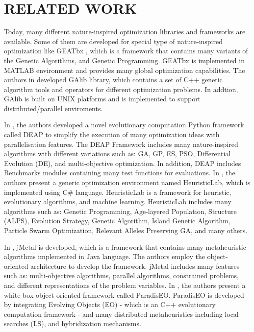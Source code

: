 \documentclass[a4paper,twoside]{article}
\begin{document}
\section{\uppercase{Related Work}}
Today, many different nature-inspired optimization libraries and frameworks are available. Some of them are developed for special type of nature-inspired optimization like GEATbx \cite{GEATbx}, which is a framework that contains many variants of the Genetic Algorithms, and Genetic Programming. GEATbx is implemented in MATLAB environment and provides many global optimization capabilities. The authors in \cite {GAlib} developed GAlib library, which contains a set of C++ genetic algorithm tools and operators for different optimization problems. In addtion, GAlib is built on UNIX platforms and is implemented to support distributed/parallel enviroments. 

In \cite {DEAP_JMLR2012}, the authors developed a novel evolutionary computation Python framework called DEAP to simplify the execution of many optimization ideas with  parallelisation features. The DEAP Framework includes many nature-inspired algorithms with different variations such as: GA, GP, ES, PSO, Differential Evolution (DE), and multi-objective optimization. In addition, DEAP includes Benchmarks modules containing many test functions for evaluations. In \cite{Wagner04}, the authors present a generic optimization environment named HeuristicLab, which is implemented using C\# language. HeuristicLab is a framework for heuristic, evolutionary algorithms, and machine learning. HeuristicLab includes many algorithms such as: Genetic Programming, Age-layered Population, Structure (ALPS), Evolution Strategy, Genetic Algorithm, Island Genetic Algorithm, Particle Swarm Optimization, Relevant Alleles Preserving GA, and many others. 

In \cite{Durillo2011}, jMetal is developed, which is a framework that contains many metaheuristic algorithms implemented in Java language. The authors employ the object-oriented architecture to develop the framework. jMetal includes many features such as: multi-objective algorithms, parallel algorithms, constrained problems, and different representations of the problem variables. In \cite{Cahon2004,humeau13}, the authors present a white-box object-oriented framework called ParadisEO. ParadisEO is developed by integrating Evolving Objects (EO) - which is an C++ evolutionary computation framework - and many distributed metaheuristics including local searches (LS), and hybridization mechanisms.  
\end{document}
